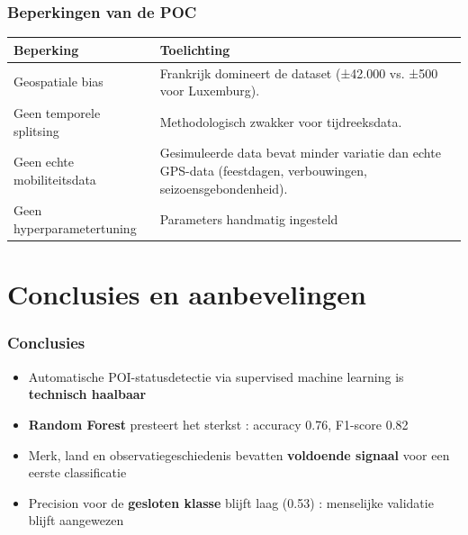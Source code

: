 \documentclass[aspectratio=169]{beamer}
\begin{document}
    \begin{frame}
        \frametitle{Beperkingen van de POC}
        
        \begin{table}
            \centering
            \begin{tabular}{p{3.5cm}p{9cm}}
                \toprule
                \textbf{Beperking} & \textbf{Toelichting} \\
                \midrule
                Geospatiale bias & Frankrijk domineert de dataset (±42.000 vs. ±500 voor Luxemburg). \\
                \addlinespace
                Geen temporele splitsing & Methodologisch zwakker voor tijdreeksdata. \\
                \addlinespace
                Geen echte mobiliteitsdata & Gesimuleerde data bevat minder variatie dan echte GPS-data (feestdagen, verbouwingen, seizoensgebondenheid). \\
                \addlinespace
                Geen hyperparametertuning & Parameters handmatig ingesteld\\
                \bottomrule
            \end{tabular}
        \end{table}
        
    \end{frame}
    
    \section{Conclusies en aanbevelingen}
    
    \begin{frame}
        \frametitle{Conclusies}
        
        \begin{itemize}
            \item Automatische POI-statusdetectie via supervised machine learning is \textbf{technisch haalbaar}
            \item \textbf{Random Forest} presteert het sterkst : accuracy 0.76, F1-score 0.82
            \item Merk, land en observatiegeschiedenis bevatten \textbf{voldoende signaal} voor een eerste classificatie
            \item Precision voor de \textbf{gesloten klasse} blijft laag (0.53) : menselijke validatie blijft aangewezen
        \end{itemize}
        
    \end{frame}
    
\end{document}
